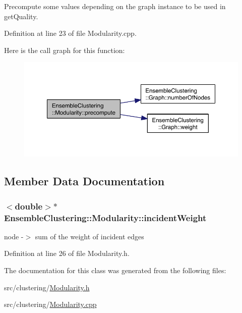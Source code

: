 Precompute some values depending on the graph instance to be used in get\-Quality. 



Definition at line 23 of file Modularity.\-cpp.



Here is the call graph for this function\-:\nopagebreak
\begin{figure}[H]
\begin{center}
\leavevmode
\includegraphics[width=350pt]{class_ensemble_clustering_1_1_modularity_a5c449dd6b3b3485dcc497edd8dc3c156_cgraph}
\end{center}
\end{figure}




\subsection{Member Data Documentation}
\hypertarget{class_ensemble_clustering_1_1_modularity_abc6c72d596cd3f00cce8c8c87e602df1}{
\subsubsection[{incident\-Weight}]{$<$double$>$$\ast$ Ensemble\-Clustering\-::\-Modularity\-::incident\-Weight\hspace{0.3cm}{\ttfamily [protected]}}}\label{class_ensemble_clustering_1_1_modularity_abc6c72d596cd3f00cce8c8c87e602df1}


node -\/$>$ sum of the weight of incident edges 



Definition at line 26 of file Modularity.\-h.



The documentation for this class was generated from the following files\-:\begin{DoxyCompactItemize}
\item 
src/clustering/\hyperlink{_modularity_8h}{Modularity.\-h}\item 
src/clustering/\hyperlink{_modularity_8cpp}{Modularity.\-cpp}\end{DoxyCompactItemize}
